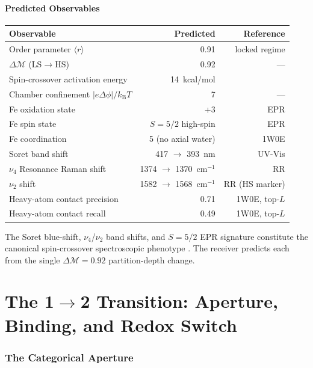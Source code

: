\documentclass[11pt,twocolumn,a4paper]{article}
\theoremstyle{definition}
\theoremstyle{remark}
\newcommand{\kB}{k_{\mathrm{B}}}
\newcommand{\depth}{\mathcal{M}}
\newcommand{\orderpar}{\langle r \rangle}
\begin{document}
\subsection{Predicted Observables}

\begin{center}
\small
\begin{tabular}{lrr}
\toprule
\textbf{Observable} & \textbf{Predicted} & \textbf{Reference} \\
\midrule
Order parameter $\orderpar$ & 0.91 & locked regime \\
$\Delta\depth$ (LS$\to$HS) & 0.92 & --- \\
Spin-crossover activation energy & 14~kcal/mol & \citep{schunemann2007} \\
Chamber confinement $|e\Delta\phi|/\kB T$ & 7 & --- \\
Fe oxidation state & +3 & EPR \\
Fe spin state & $S = 5/2$ high-spin & EPR \\
Fe coordination & 5 (no axial water) & 1W0E \\
Soret band shift & 417 $\to$ 393~nm & UV-Vis \\
$\nu_4$ Resonance Raman shift & 1374 $\to$ 1370~cm$^{-1}$ & RR \\
$\nu_2$ shift & 1582 $\to$ 1568~cm$^{-1}$ & RR (HS marker) \\
Heavy-atom contact precision & 0.71 & 1W0E, top-$L$ \\
Heavy-atom contact recall & 0.49 & 1W0E, top-$L$ \\
\bottomrule
\end{tabular}
\end{center}

The Soret blue-shift, $\nu_4$/$\nu_2$ band shifts, and $S=5/2$ EPR signature constitute the canonical spin-crossover spectroscopic phenotype \citep{egawa1991}. The receiver predicts each from the single $\Delta\depth = 0.92$ partition-depth change.

\part{The 1$\to$2 Transition: Aperture, Binding, and Redox Switch}

\section{The Categorical Aperture}
\label{sec:transition}
\end{document}
